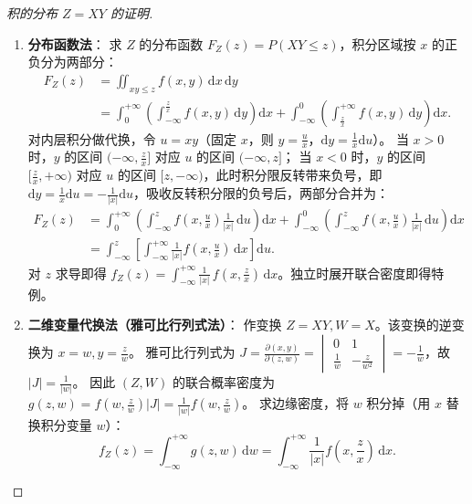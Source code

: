 ﻿\documentclass[lang=cn,11pt]{elegantbook}
\begin{document}
\begin{proof}[积的分布 $Z=XY$ 的证明]
\begin{enumerate}
    \item \textbf{分布函数法}：
    求 $Z$ 的分布函数 $F_Z(z) = P(XY \leqslant z)$，积分区域按 $x$ 的正负分为两部分：
    \begin{align*}
        F_Z(z) &= \iint_{xy \leqslant z} f(x,y)\,\mathrm{d}x\,\mathrm{d}y \\
        &= \int_{0}^{+\infty} \left( \int_{-\infty}^{\frac{z}{x}} f(x,y)\,\mathrm{d}y \right) \mathrm{d}x + \int_{-\infty}^{0} \left( \int_{\frac{z}{x}}^{+\infty} f(x,y)\,\mathrm{d}y \right) \mathrm{d}x.
    \end{align*}
    对内层积分做代换，令 $u = xy$（固定 $x$，则 $y = \frac{u}{x}$，$\mathrm{d}y = \frac{1}{x}\mathrm{d}u$）。
    当 $x > 0$ 时，$y$ 的区间 $(-\infty, \frac{z}{x}]$ 对应 $u$ 的区间 $(-\infty, z]$；
    当 $x < 0$ 时，$y$ 的区间 $[\frac{z}{x}, +\infty)$ 对应 $u$ 的区间 $[z, -\infty)$，此时积分限反转带来负号，即 $\mathrm{d}y = \frac{1}{x}\mathrm{d}u = -\frac{1}{|x|}\mathrm{d}u$，吸收反转积分限的负号后，两部分合并为：
    \begin{align*}
    F_Z(z) &= \int_{0}^{+\infty} \left( \int_{-\infty}^{z} f\!\left(x,\frac{u}{x}\right)\frac{1}{|x|}\,\mathrm{d}u \right) \mathrm{d}x + \int_{-\infty}^{0} \left( \int_{-\infty}^{z} f\!\left(x,\frac{u}{x}\right)\frac{1}{|x|}\,\mathrm{d}u \right) \mathrm{d}x \\
    &= \int_{-\infty}^{z} \left[ \int_{-\infty}^{+\infty} \frac{1}{|x|}f\!\left(x,\frac{u}{x}\right)\,\mathrm{d}x \right] \mathrm{d}u.
    \end{align*}
    对 $z$ 求导即得 $f_Z(z) = \displaystyle\int_{-\infty}^{+\infty}\frac{1}{|x|}\,f\!\left(x, \frac{z}{x}\right)\,\mathrm{d}x$。独立时展开联合密度即得特例。

    \item \textbf{二维变量代换法（雅可比行列式法）}：
    作变换 $Z = XY, W = X$。该变换的逆变换为 $x = w, y = \frac{z}{w}$。
    雅可比行列式为 $J = \frac{\partial(x,y)}{\partial(z,w)} = \begin{vmatrix} 0 & 1 \\ \frac{1}{w} & -\frac{z}{w^2} \end{vmatrix} = -\frac{1}{w}$，故 $|J| = \frac{1}{|w|}$。
    因此 $(Z,W)$ 的联合概率密度为 $g(z,w) = f\!\left(w, \frac{z}{w}\right) |J| = \frac{1}{|w|}f\!\left(w, \frac{z}{w}\right)$。
    求边缘密度，将 $w$ 积分掉（用 $x$ 替换积分变量 $w$）：
    \[
    f_Z(z) = \int_{-\infty}^{+\infty} g(z,w)\,\mathrm{d}w = \int_{-\infty}^{+\infty} \frac{1}{|x|}f\!\left(x, \frac{z}{x}\right)\,\mathrm{d}x.
    \]
\end{enumerate}
\end{proof}
\end{document}
